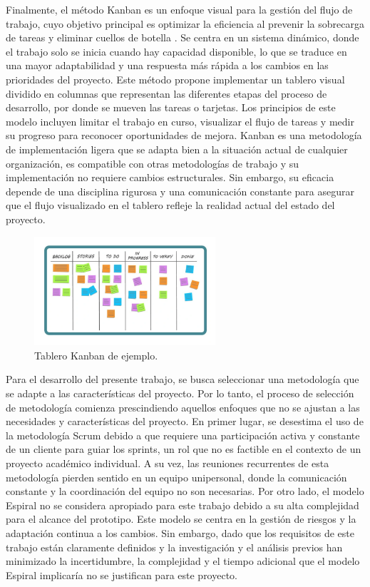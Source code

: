 Finalmente, el método Kanban es un enfoque visual para la gestión del flujo de trabajo, cuyo objetivo principal es optimizar la eficiencia al prevenir la sobrecarga de tareas y eliminar cuellos de botella \cite{alaidaros2021kanban}. Se centra en un sistema dinámico, donde el trabajo solo se inicia cuando hay capacidad disponible, lo que se traduce en una mayor adaptabilidad y una respuesta más rápida a los cambios en las prioridades del proyecto. Este método propone implementar un tablero visual dividido en columnas que representan las diferentes etapas del proceso de desarrollo, por donde se mueven las tareas o tarjetas. Los principios de este modelo incluyen limitar el trabajo en curso, visualizar el flujo de tareas y medir su progreso para reconocer oportunidades de mejora. Kanban es una metodología de implementación ligera que se adapta bien a la situación actual de cualquier organización, es compatible con otras metodologías de trabajo y su implementación no requiere cambios estructurales. Sin embargo, su eficacia depende de una disciplina rigurosa y una comunicación constante para asegurar que el flujo visualizado en el tablero refleje la realidad actual del estado del proyecto.

\begin{figure}[!htb]
    \centering
    \includegraphics[width=0.6\textwidth]{Figures/model-kanban.png}
    \caption{Tablero Kanban de ejemplo.}
\end{figure}

Para el desarrollo del presente trabajo, se busca seleccionar una metodología que se adapte a las características del proyecto. Por lo tanto, el proceso de selección de metodología comienza prescindiendo aquellos enfoques que no se ajustan a las necesidades y características del proyecto. En primer lugar, se desestima el uso de la metodología Scrum debido a que requiere una participación activa y constante de un cliente para guiar los sprints, un rol que no es factible en el contexto de un proyecto académico individual. A su vez, las reuniones recurrentes de esta metodología pierden sentido en un equipo unipersonal, donde la comunicación constante y la coordinación del equipo no son necesarias. Por otro lado, el modelo Espiral no se considera apropiado para este trabajo debido a su alta complejidad para el alcance del prototipo. Este modelo se centra en la gestión de riesgos y la adaptación continua a los cambios. Sin embargo, dado que los requisitos de este trabajo están claramente definidos y la investigación y el análisis previos han minimizado la incertidumbre, la complejidad y el tiempo adicional que el modelo Espiral implicaría no se justifican para este proyecto.

